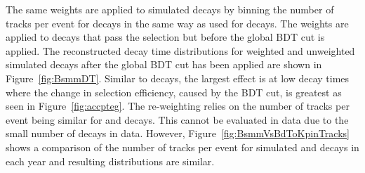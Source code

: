 The same weights are applied to simulated \bsmumu decays by binning the number of tracks per event for \bsmumu decays in the same way as used for \bdkpi decays. The weights are applied to decays that pass the selection but before the global BDT cut is applied. The reconstructed decay time distributions for weighted and unweighted \bsmumu simulated decays after the global BDT cut has been applied are shown in Figure~\ref{fig:BsmmDT}. %
Similar to \bdkpi decays, the largest effect is at low decay times where the change in selection efficiency, caused by the BDT cut, is greatest as seen in Figure~\ref{fig:accpteg}.      
 The re-weighting relies on the number of tracks per event being similar for \bdkpi and \bsmumu decays. This cannot be evaluated in data due to the small number of \bsmumu decays in data. However, Figure~\ref{fig:BsmmVsBdToKpinTracks} shows a comparison of the number of tracks per event for simulated \bsmumu and \bdkpi decays in each year and resulting distributions are similar.
                                                                                                                                                                                                           
